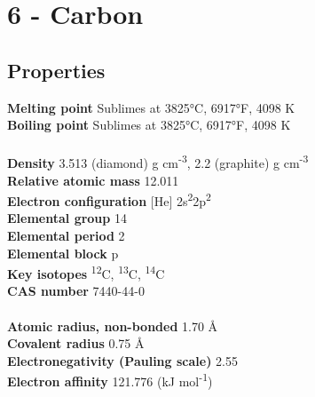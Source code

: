 \section{6 - Carbon}
\label{sec:elem-carbon}
\subsection{Properties}
\textbf{Melting point} Sublimes at 3825°C, 6917°F, 4098 K\\
\textbf{Boiling point} Sublimes at 3825°C, 6917°F, 4098 K\\
\\
\textbf{Density} 3.513 (diamond) g cm\textsuperscript{-3}, 2.2 (graphite) g cm\textsuperscript{-3}\\
\textbf{Relative atomic mass} 12.011\\
\textbf{Electron configuration} [He] 2s\textsuperscript{2}2p\textsuperscript{2}\\
\textbf{Elemental group} 14\\
\textbf{Elemental period} 2\\
\textbf{Elemental block} p\\
\textbf{Key isotopes} \textsuperscript{12}C, \textsuperscript{13}C, \textsuperscript{14}C\\
\textbf{CAS number} 7440-44-0\\
\\
\textbf{Atomic radius, non-bonded} 1.70 Å\\
\textbf{Covalent radius} 0.75 Å\\
\textbf{Electronegativity (Pauling scale)} 2.55\\
\textbf{Electron affinity} 121.776 (kJ mol\textsuperscript{-1})\\